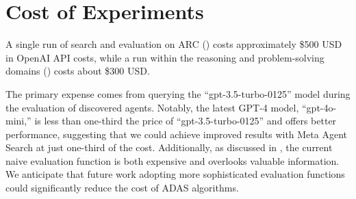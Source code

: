 \documentclass{article}
\newcommand{\problem}{ADAS\xspace}
\newcommand{\ouralgo}{Meta Agent Search\xspace}
\begin{document}
\begin{table}[h]
\end{table}

\section{Cost of Experiments}
\label{append_section:cost}

A single run of search and evaluation on ARC () costs approximately \$500 USD in OpenAI API costs, while a run within the reasoning and problem-solving domains () costs about \$300 USD.

The primary expense comes from querying the ``gpt-3.5-turbo-0125'' model during the evaluation of discovered agents.
Notably, the latest GPT-4 model, ``gpt-4o-mini,'' is less than one-third the price of ``gpt-3.5-turbo-0125'' and offers better performance, suggesting that we could achieve improved results with \ouralgo at just one-third of the cost. Additionally, as discussed in , the current naive evaluation function is both expensive and overlooks valuable information. We anticipate that future work adopting more sophisticated evaluation functions could significantly reduce the cost of \problem algorithms.
\end{document}

